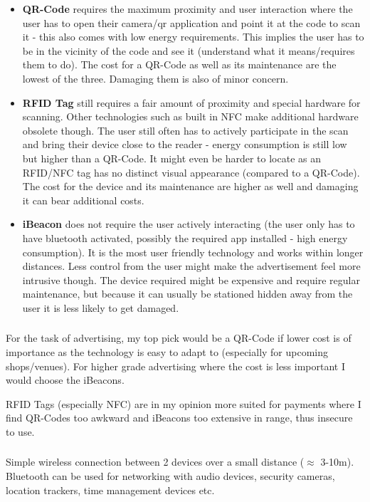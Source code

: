 \documentclass[12pt]{article}
\newcommand{\multipartexercise}{\addtocounter{subsection}{1}\setcounter{subsubsection}{0}}
\newcommand{\exercisepart}{\subsubsection{}}
\begin{document}
\begin{itemize}
  \item \textbf{QR-Code} requires the maximum proximity and user interaction where the user has to open their camera/qr application and point it at the code to scan it - this also comes with low energy requirements. This implies the user has to be in the vicinity of the code and see it (understand what it means/requires them to do). The cost for a QR-Code as well as its maintenance are the lowest of the three. Damaging them is also of minor concern.
  \item \textbf{RFID Tag} still requires a fair amount of proximity and special hardware for scanning. Other technologies such as built in NFC make additional hardware obsolete though. The user still often has to actively participate in the scan and bring their device close to the reader - energy consumption is still low but higher than a QR-Code. It might even be harder to locate as an RFID/NFC tag has no distinct visual appearance (compared to a QR-Code). The cost for the device and its maintenance are higher as well and damaging it can bear additional costs.
  \item \textbf{iBeacon} does not require the user actively interacting (the user only has to have bluetooth activated, possibly the required app installed - high energy consumption). It is the most user friendly technology and works within longer distances. Less control from the user might make the advertisement feel more intrusive though. The device required might be expensive and require regular maintenance, but because it can usually be stationed hidden away from the user it is less likely to get damaged.
\end{itemize}

\exercisepart
For the task of advertising, my top pick would be a QR-Code if lower cost is of importance as the technology is easy to adapt to (especially for upcoming shops/venues). For higher grade advertising where the cost is less important I would choose the iBeacons.

RFID Tags (especially NFC) are in my opinion more suited for payments where I find QR-Codes too awkward and iBeacons too extensive in range, thus insecure to use.

\multipartexercise
\exercisepart
Simple wireless connection between 2 devices over a small distance ($\approx$ 3-10m). Bluetooth can be used for networking with audio devices, security cameras, location trackers, time management devices etc.
\end{document}
